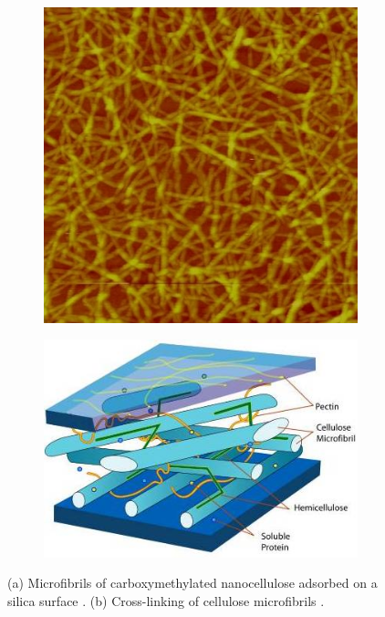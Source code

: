 \begin{figure}
\centering

\begin{subfigure}{.49\linewidth}
  \centering
  \includegraphics[width=.8\linewidth]{img/AFM_Innventia_nanocellulose}
  \caption{}
  \label{fig:cellulose}
\end{subfigure}
\begin{subfigure}{.49\linewidth}
  \centering
  \includegraphics[width=\linewidth]{img/crosslink}
  \caption{}
  \label{fig:crosslink}
\end{subfigure}%
\caption{(a) Microfibrils of carboxymethylated nanocellulose adsorbed on a silica surface \cite{wikimediacommons2010afm}. (b) Cross-linking of cellulose microfibrils \cite{wikimediacommons2007plant}.}
\end{figure}






